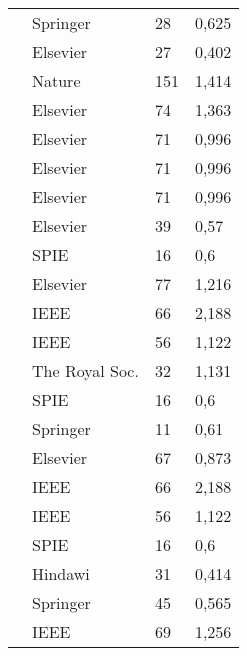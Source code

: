 \begin{longtable}{p{6.5cm}p{3.5cm}p{.3cm}p{.5cm}}
            \citet{FENG2018}              & Springer                & 28  & 0,625 \\
            \citet{PAN2018}               & Elsevier                & 27  & 0,402 \\
            \citet{HAN2017}               & Nature                  & 151 & 1,414 \\
            \citet{ZHENG2017}             & Elsevier                & 74  & 1,363 \\
            \citet{WAN2017a}              & Elsevier                & 71  & 0,996 \\
            \citet{PAN2017}               & Elsevier                & 71  & 0,996 \\
            \citet{WAN2017b}              & Elsevier                & 71  & 0,996 \\
            \citet{WAHAB2017}             & Elsevier                & 39  & 0,57  \\
            \citet{BEJNORDI2017}          & SPIE                    & 16  & 0,6   \\
            \citet{KRAWCZYK2016}          & Elsevier                & 77  & 1,216 \\
            \citet{XU2016}                & IEEE                    & 66  & 2,188 \\
            \citet{ZHANG2016}             & IEEE                    & 56  & 1,122 \\
            \citet{CHAN2016}              & The Royal Soc.          & 32  & 1,131 \\
            \citet{BALAZSI2016}           & SPIE                    & 16  & 0,6   \\
            \citet{KORKMAZ2016}           & Springer                & 11  & 0,61  \\
            \citet{TASHK2015}             & Elsevier                & 67  & 0,873 \\
            \citet{ZHANG2015}             & IEEE                    & 66  & 2,188 \\
            \citet{KHAN2015}              & IEEE                    & 56  & 1,122 \\
            \citet{WANG2014}              & SPIE                    & 16  & 0,6   \\
            \citet{LOUKAS2013}            & Hindawi                 & 31  & 0,414 \\
            \citet{ISSACNIWAS2012}        & Springer                & 45  & 0,565 \\
            \citet{DUNDAR2011}            & IEEE                    & 69  & 1,256

    \end{longtable}
